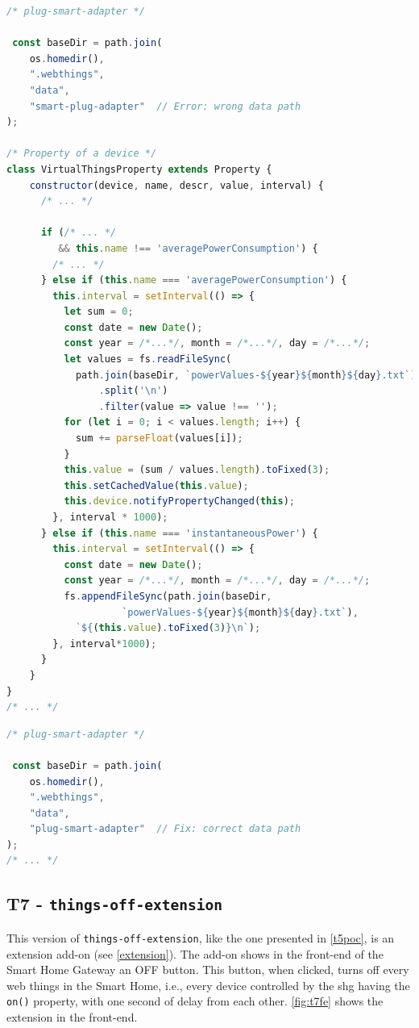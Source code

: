 \begin{lstlisting}[language=JavaScript, label=lst:t6, caption=T6-v2 - Plug Smart Adapter]
/* plug-smart-adapter */
 
 const baseDir = path.join(
    os.homedir(),
    ".webthings",
    "data",
    "smart-plug-adapter"  // Error: wrong data path
);

/* Property of a device */
class VirtualThingsProperty extends Property {
    constructor(device, name, descr, value, interval) {
      /* ... */
  
      if (/* ... */
         && this.name !== 'averagePowerConsumption') {
        /* ... */
      } else if (this.name === 'averagePowerConsumption') {
        this.interval = setInterval(() => {
          let sum = 0;
          const date = new Date();
          const year = /*...*/, month = /*...*/, day = /*...*/;
          let values = fs.readFileSync(
            path.join(baseDir, `powerValues-${year}${month}${day}.txt`), 'utf-8')
                .split('\n')
                .filter(value => value !== '');
          for (let i = 0; i < values.length; i++) {
            sum += parseFloat(values[i]);
          }
          this.value = (sum / values.length).toFixed(3);
          this.setCachedValue(this.value);
          this.device.notifyPropertyChanged(this);
        }, interval * 1000);
      } else if (this.name === 'instantaneousPower') {  
        this.interval = setInterval(() => {
          const date = new Date();
          const year = /*...*/, month = /*...*/, day = /*...*/;
          fs.appendFileSync(path.join(baseDir,
                    `powerValues-${year}${month}${day}.txt`),
            `${(this.value).toFixed(3)}\n`);
        }, interval*1000);    
      }
    }
}  
/* ... */
\end{lstlisting}


\begin{lstlisting}[language=JavaScript, label=lst:t6v2fix, caption=T6-v2 - Data Path Fix]
/* plug-smart-adapter */
 
 const baseDir = path.join(
    os.homedir(),
    ".webthings",
    "data",
    "plug-smart-adapter"  // Fix: correct data path
);
/* ... */
\end{lstlisting}


\subsection{T7 - \texttt{things-off-extension}}
\label{t7poc}

 This version of \texttt{things-off-extension}, like the one presented in \autoref{t5poc}, is an extension add-on (see \autoref{extension}). The add-on shows in the front-end of the Smart Home Gateway an OFF button. This button, when clicked, turns off every \glspl{web thing} in the Smart Home, i.e., every device controlled by the \gls{shg} having the \texttt{on()} property, with one second of delay from each other. \autoref{fig:t7fe} shows the extension in the front-end.

